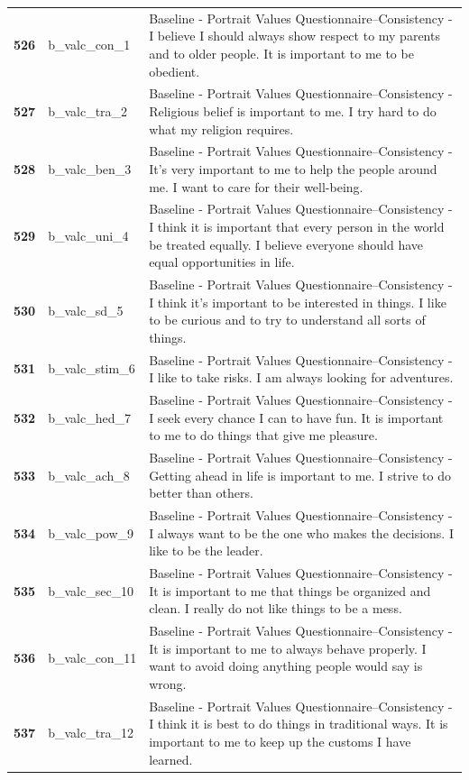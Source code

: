 \documentclass[
  letterpaper,
  DIV=11,
  numbers=noendperiod]{scrartcl}
\begin{document}
\begin{longtable}[t]{>{}cll}
\textbf{526} & b\_valc\_con\_1 & Baseline - Portrait Values Questionnaire--Consistency - I believe I should always show respect to my parents and to older people. It is important to me to be obedient.\\
\textbf{527} & b\_valc\_tra\_2 & Baseline - Portrait Values Questionnaire--Consistency - Religious belief is important to me. I try hard to do what my religion requires.\\
\textbf{528} & b\_valc\_ben\_3 & Baseline - Portrait Values Questionnaire--Consistency - It's very important to me to help the people around me. I want to care for their well-being.\\
\textbf{529} & b\_valc\_uni\_4 & Baseline - Portrait Values Questionnaire--Consistency - I think it is important that every person in the world be treated equally. I believe everyone should have equal opportunities in life.\\
\textbf{530} & b\_valc\_sd\_5 & Baseline - Portrait Values Questionnaire--Consistency - I think it's important to be interested in things. I like to be curious and to try to understand all sorts of things.\\
\addlinespace
\textbf{531} & b\_valc\_stim\_6 & Baseline - Portrait Values Questionnaire--Consistency - I like to take risks. I am always looking for adventures.\\
\textbf{532} & b\_valc\_hed\_7 & Baseline - Portrait Values Questionnaire--Consistency - I seek every chance I can to have fun. It is important to me to do things that give me pleasure.\\
\textbf{533} & b\_valc\_ach\_8 & Baseline - Portrait Values Questionnaire--Consistency - Getting ahead in life is important to me. I strive to do better than others.\\
\textbf{534} & b\_valc\_pow\_9 & Baseline - Portrait Values Questionnaire--Consistency - I always want to be the one who makes the decisions. I like to be the leader.\\
\textbf{535} & b\_valc\_sec\_10 & Baseline - Portrait Values Questionnaire--Consistency - It is important to me that things be organized and clean. I really do not like things to be a mess.\\
\addlinespace
\textbf{536} & b\_valc\_con\_11 & Baseline - Portrait Values Questionnaire--Consistency - It is important to me to always behave properly. I want to avoid doing anything people would say is wrong.\\
\textbf{537} & b\_valc\_tra\_12 & Baseline - Portrait Values Questionnaire--Consistency - I think it is best to do things in traditional ways. It is important to me to keep up the customs I have learned.\\

\end{longtable}
\end{document}
